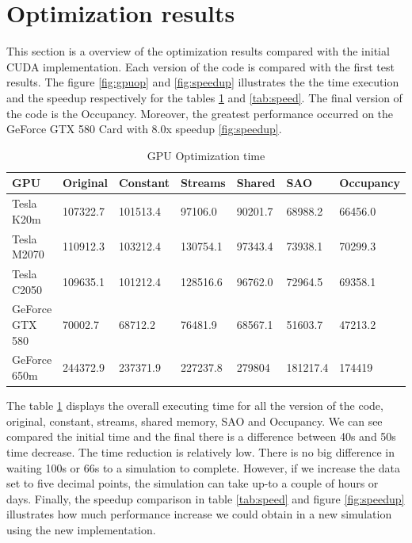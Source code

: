\section{Optimization results}

This section is a overview of the optimization results compared with the initial CUDA implementation. Each version of the code is compared with the first test results. The figure \ref{fig:gpuop} and \ref{fig:speedup} illustrates the the time execution and the speedup respectively for the tables \ref{tab:time} and \ref{tab:speed}. The final version of the code is the Occupancy. Moreover, the greatest performance occurred on the GeForce GTX 580 Card with 8.0x speedup \ref{fig:speedup}.

\begin{table}[h]
\centering
  \begin{tabular} { |  l  |  l | l  |  l  | l | l | l |}
    \hline
    GPU & Original & Constant & Streams & Shared & SAO & Occupancy \\
    \hline
    Tesla K20m & 107322.7 & 101513.4 & 97106.0 & 90201.7 & 68988.2 & 66456.0\\
   \hline
    Tesla M2070 & 110912.3 & 103212.4 & 130754.1 & 97343.4 & 73938.1 & 70299.3\\
    \hline
    Tesla C2050 & 109635.1 & 101212.4 & 128516.6 & 96762.0 & 72964.5 & 69358.1\\
   \hline
    GeForce GTX 580 & 70002.7 & 68712.2 & 76481.9 & 68567.1 & 51603.7 & 47213.2\\
   \hline
    GeForce 650m & 244372.9 & 237371.9 & 227237.8 & 279804 & 181217.4 & 174419\\
   \hline
  \end{tabular}
    \caption{GPU Optimization time}
  \label{tab:time}
  \end{table}
  
  The table \ref{tab:time} displays the overall executing time for all the version of the code, original, constant, streams, shared memory, SAO and Occupancy. We can see compared the initial time and the final there is a difference between 40s and 50s time decrease. The time reduction is relatively low. There is no big difference in waiting 100s or 66s to a simulation to complete. However, if we increase the data set to five decimal points, the simulation can take up-to a couple of hours or days. Finally, the speedup comparison in table \ref{tab:speed} and figure \ref{fig:speedup} illustrates how much performance increase we could obtain in a new simulation using the new implementation.
  
